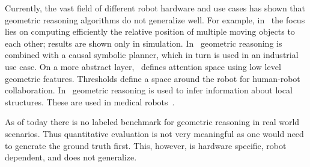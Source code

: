 Currently, the vast field of different robot hardware and use cases has shown that geometric reasoning algorithms do not generalize well.
For example, in~\cite{havur2014geometric} the focus lies on computing efficiently the relative position of multiple moving objects to each other; results are shown only in simulation.
In~\cite{erdem2011combining} geometric reasoning is combined with a causal symbolic planner, which in turn is used in an industrial use case.
On a more abstract layer,~\cite{marin2009towards} defines attention space using low level geometric features.
Thresholds define a space around the robot for human-robot collaboration.
In~\cite{subburaj2007high, subburaj2009automated, lee2009geometric} geometric reasoning is used to infer information about local structures.
These are used in medical robots~\cite{subburaj2007high, subburaj2009automated}.

As of today there is no labeled benchmark for geometric reasoning in real world scenarios.
Thus quantitative evaluation is not very meaningful as one would need to generate the ground truth first.
This, however, is hardware specific, robot dependent, and does not generalize.

